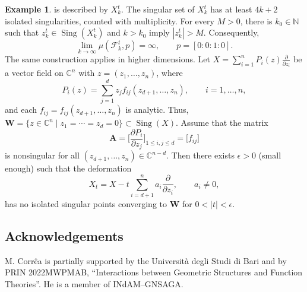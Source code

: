 \documentclass[10pt,twoside]{amsart}
\numberwithin{equation}{section}
\theoremstyle{definition}
\newtheorem{example}[proposition]{Example}
\theoremstyle{remark}
\DeclareMathOperator{\sing}{Sing}
\newcommand{\C}{\mathbb{C}}
\newcommand{\fol}{\mathcal{F}}
\newcommand{\W}{\mathbf{W}}
\begin{document}
\begin{example}
is described by $X_k^t$. The singular set of $X_k^t$ has at least $4k+2$ isolated singularities, counted with multiplicity.
For every $M>0$, there is $k_0\in\mathbb N$ such that $z_k^t\in\sing(X_k^t)$ and $k>k_0$ imply $|z_k^t|>M$. Consequently,
\[
\lim_{k\to\infty}\mu(\fol_k^t, p)=\infty,
\qquad
p=[0:0:1:0].
\]
The same construction applies in higher dimensions. Let $X=\sum_{i=1}^nP_i(z)\frac{\partial}{\partial z_i}$
be a vector field on $\C^n$ with $z=(z_1,\ldots,z_n)$, where
\[
P_i(z) = \sum_{j=1}^{d}z_jf_{ij}(z_{d+1},\ldots,z_n),\qquad i=1,\ldots,n,
\]
and each $f_{ij}=f_{ij}(z_{d+1},\ldots,z_n)$ is analytic. Thus,
$\W=\{z\in\C^n\mid z_1=\cdots=z_d=0\}\subset \sing(X).$
Assume that the matrix
\[
\mathbf{A}=\bigg[\frac{\partial P_i}{\partial z_j}\bigg]_{1\leq i,j\leq d}= \bigg[f_{ij}\bigg]
\]
is nonsingular for all $(z_{d+1},\ldots, z_n)\in\C^{n-d}$. Then there exists $\epsilon>0$ (small enough) such that the deformation
\[
X_t=X-t\sum_{i=d+1}^{n}a_{i}\frac{\partial}{\partial z_i},
\qquad a_i\ne0,
\]
has no isolated singular points converging to $\W$ for $0<|t|<\epsilon$.
\end{example}


\subsection*{Acknowledgements}
M. Corr\^ea is partially supported by the Universit\`a degli Studi di Bari and by PRIN 2022MWPMAB, ``Interactions between Geometric Structures and Function Theories''. He is a member of INdAM--GNSAGA.
\end{document}
